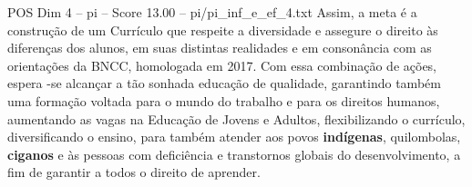 \begin{textsample}{POS Dim 4 – pi – Score 13.00 – pi/pi\_inf\_e\_ef\_4.txt}
Assim, a meta é a construção de um Currículo que respeite a diversidade e assegure o direito às diferenças dos alunos, em suas distintas realidades e em consonância com as orientações da BNCC, homologada em 2017.
Com essa combinação de ações, espera -se alcançar a tão sonhada educação de qualidade, garantindo também uma formação voltada para o mundo do trabalho e para os direitos humanos, aumentando as vagas na Educação de Jovens e Adultos, flexibilizando o currículo, diversificando o ensino, para também atender aos povos \textbf{indígenas}, quilombolas, \textbf{ciganos} e às pessoas com deficiência e transtornos globais do desenvolvimento, a fim de garantir a todos o direito de aprender.

\end{textsample}
